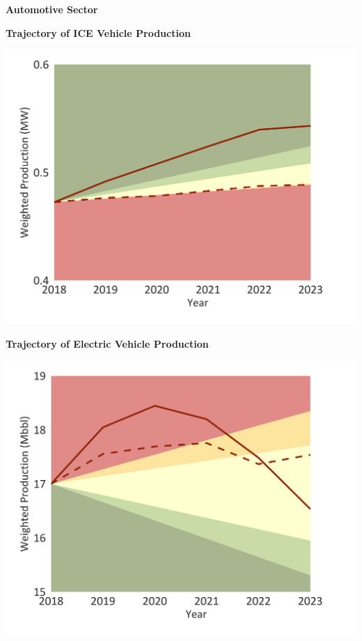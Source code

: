 \documentclass[10pt,table,a4]{article}\usepackage[]{graphicx}\usepackage[]{color}
\begin{document}
	
	\begin{center}
		\textbf{Automotive Sector}
	\end{center}
	
	\begin{minipage}[t]{.49\linewidth}
		\textbf{Trajectory of ICE Vehicle Production}
		
		\includegraphics[trim = {0 0cm 0 0},width=1\linewidth]{CAFigures/Fig20}
		
	\end{minipage}	
	\hspace{.02\linewidth}
	\begin{minipage}[t]{.49\textwidth}
		\textbf{Trajectory of Electric Vehicle Production}
		
		\includegraphics[trim = {0 0cm 0 0},width=1\linewidth]{CAFigures/Fig21}
		
	\end{minipage}		
	
\end{document}
